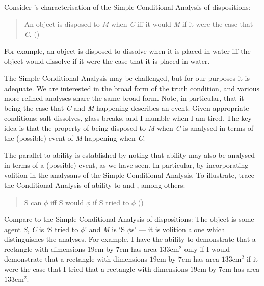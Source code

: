 \begin{note}
  Consider \citeauthor{Choi:2021wg}'s characterisation of the Simple Conditional Analysis of dispositions:
  \begin{quote}
    An object is disposed to \emph{M} when \emph{C} iff it would \emph{M} if it were the case that \emph{C}.\nolinebreak
    \mbox{}\hfill\mbox{(\citeyear{Choi:2021wg})}
  \end{quote}
  For example, an object is disposed to dissolve when it is placed in water iff the object would dissolve if it were the case that it is placed in water.

  The Simple Conditional Analysis may be challenged, but for our purposes it is adequate.
  We are interested in the broad form of the truth condition, and various more refined analyses share the same broad form.
  Note, in particular, that it being the case that \emph{C} and \emph{M} happening describes an event.
  Given appropriate conditions; salt dissolves, glass breaks, and I mumble when I am tired.
  The key idea is that the property of being disposed to \emph{M} when \emph{C} is analysed in terms of the (possible) event of \emph{M} happening when \emph{C}.

  The parallel to ability is established by noting that ability may also be analysed in terms of a (possible) event, as we have seen.
  In particular, by incorporating volition in the analysans of the Simple Conditional Analysis.
  To illustrate, \citeauthor{Mandelkern:2017aa} trace the Conditional Analysis of ability  to \textcite{Hume:1748tp} and \textcite{Moore:1912te}, among others:
  \begin{quote}
    S can \(\phi\) iff S would \(\phi\) if S tried to \(\phi\)\nolinebreak
    \mbox{}\hfill\mbox{(\citeyear[Cf.][308]{Mandelkern:2017aa})}
  \end{quote}
  Compare to the Simple Conditional Analysis of dispositions:
  The object is some agent \emph{S}, \emph{C} is `S tried to \(\phi\)' and \emph{M} is `S \(\phi\)s' --- it is volition alone which distinguishes the analyses.
  For example, I have the ability to demonstrate that a rectangle with dimensions \(19\text{cm}\) by \(7\text{cm}\) has area \(133\text{cm}^{2}\) only if I would demonstrate that a rectangle with dimensions \(19\text{cm}\) by \(7\text{cm}\) has area \(133\text{cm}^{2}\) if it were the case that I tried that a rectangle with dimensions \(19\text{cm}\) by \(7\text{cm}\) has area \(133\text{cm}^{2}\).
\end{note}

